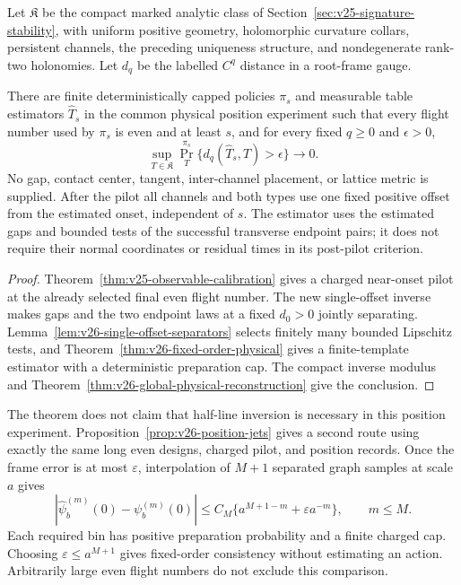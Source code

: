 Let \(\mathfrak K\) be the compact marked analytic class of
Section~\ref{sec:v25-signature-stability}, with uniform positive geometry,
holomorphic curvature collars, persistent channels, the preceding uniqueness
structure, and nondegenerate rank-two holonomies.  Let \(d_q\) be the
labelled \(C^q\) distance in a root-frame gauge.

\begin{theorem}
\label{thm:v26-intro-physical}
\label{thm:v25-intro-physical}
There are finite deterministically capped policies \(\pi_s\) and measurable
table estimators \(\widehat T_s\) in the common physical position experiment
such that every flight number used by \(\pi_s\) is even and at least
\(s\), and for every fixed \(q\ge0\) and \(\epsilon>0\),
\[
 \sup_{T\in\mathfrak K}\Pr_T^{\pi_s}
       \{d_q(\widehat T_s,T)>\epsilon\}\longrightarrow0.
\]
No gap, contact center, tangent, inter-channel placement, or lattice metric
is supplied.  After the pilot all channels and both types use one fixed
positive offset from the estimated onset, independent of \(s\).  The
estimator uses the estimated gaps and bounded tests of the successful
transverse endpoint pairs; it does not require their normal coordinates
or residual times in its post-pilot criterion.
\end{theorem}

\begin{proof}
Theorem~\ref{thm:v25-observable-calibration} gives a charged near-onset
pilot at the already selected final even flight number.  The new
single-offset inverse makes gaps and the two endpoint laws at a fixed
\(d_0>0\) jointly separating.  Lemma~\ref{lem:v26-single-offset-separators}
selects finitely many bounded Lipschitz tests, and
Theorem~\ref{thm:v26-fixed-order-physical} gives a finite-template estimator
with a deterministic preparation cap.  The compact inverse modulus and
Theorem~\ref{thm:v26-global-physical-reconstruction} give the conclusion.
\end{proof}

The theorem does not claim that half-line inversion is necessary in this
position experiment.  Proposition~\ref{prop:v26-position-jets} gives a
second route using exactly the same long even designs, charged pilot, and
position records.  Once the frame error is at most \(\varepsilon\),
interpolation of \(M+1\) separated graph samples at scale \(a\) gives
\[
 |\widehat\psi_b^{(m)}(0)-\psi_b^{(m)}(0)|
 \le C_M\{a^{M+1-m}+\varepsilon a^{-m}\},\qquad m\le M.
\]
Each required bin has positive preparation probability and a finite charged
cap.  Choosing \(\varepsilon\le a^{M+1}\) gives fixed-order consistency
without estimating an action.  Arbitrarily large even flight numbers do
not exclude this comparison.

